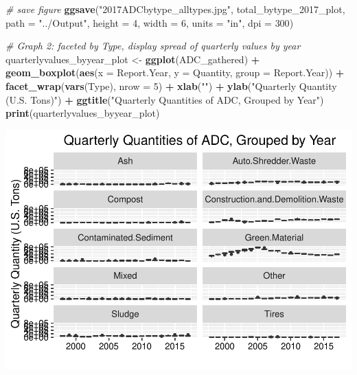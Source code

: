 \documentclass[12pt,]{article}
\newenvironment{Shaded}{\begin{snugshade}}{\end{snugshade}}
\newcommand{\KeywordTok}[1]{\textcolor[rgb]{0.13,0.29,0.53}{\textbf{#1}}}
\newcommand{\DataTypeTok}[1]{\textcolor[rgb]{0.13,0.29,0.53}{#1}}
\newcommand{\DecValTok}[1]{\textcolor[rgb]{0.00,0.00,0.81}{#1}}
\newcommand{\StringTok}[1]{\textcolor[rgb]{0.31,0.60,0.02}{#1}}
\newcommand{\CommentTok}[1]{\textcolor[rgb]{0.56,0.35,0.01}{\textit{#1}}}
\newcommand{\OperatorTok}[1]{\textcolor[rgb]{0.81,0.36,0.00}{\textbf{#1}}}
\newcommand{\NormalTok}[1]{#1}
\begin{document}
\begin{Shaded}
\begin{Highlighting}[]
\CommentTok{# save figure}
\KeywordTok{ggsave}\NormalTok{(}\StringTok{"2017ADCbytype_alltypes.jpg"}\NormalTok{, total_bytype_2017_plot, }\DataTypeTok{path =} \StringTok{"../Output"}\NormalTok{, }\DataTypeTok{height =} \DecValTok{4}\NormalTok{, }\DataTypeTok{width =} \DecValTok{6}\NormalTok{, }\DataTypeTok{units =} \StringTok{"in"}\NormalTok{, }\DataTypeTok{dpi =} \DecValTok{300}\NormalTok{)}

\CommentTok{# Graph 2: faceted by Type, display spread of quarterly values by year}
\NormalTok{quarterlyvalues_byyear_plot <-}\StringTok{ }\KeywordTok{ggplot}\NormalTok{(ADC_gathered) }\OperatorTok{+}
\StringTok{  }\KeywordTok{geom_boxplot}\NormalTok{(}\KeywordTok{aes}\NormalTok{(}\DataTypeTok{x =}\NormalTok{ Report.Year, }\DataTypeTok{y =}\NormalTok{ Quantity, }\DataTypeTok{group =}\NormalTok{ Report.Year)) }\OperatorTok{+}\StringTok{ }
\StringTok{  }\KeywordTok{facet_wrap}\NormalTok{(}\KeywordTok{vars}\NormalTok{(Type), }\DataTypeTok{nrow =} \DecValTok{5}\NormalTok{) }\OperatorTok{+}\StringTok{ }
\StringTok{  }\KeywordTok{xlab}\NormalTok{(}\StringTok{""}\NormalTok{) }\OperatorTok{+}
\StringTok{  }\KeywordTok{ylab}\NormalTok{(}\StringTok{"Quarterly Quantity (U.S. Tons)"}\NormalTok{) }\OperatorTok{+}
\StringTok{  }\KeywordTok{ggtitle}\NormalTok{(}\StringTok{"Quarterly Quantities of ADC, Grouped by Year"}\NormalTok{)}
\KeywordTok{print}\NormalTok{(quarterlyvalues_byyear_plot)}
\end{Highlighting}
\end{Shaded}

\includegraphics{SKo_Project_Template_files/figure-latex/explore_graphs-2.pdf}
\end{document}
